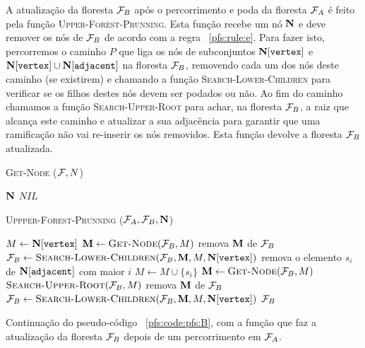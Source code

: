 \newpage
A atualização da floresta $\mathcal{F}_B$ após o percorrimento e poda da
floresta $\mathcal{F}_A$ é feito pela função \textsc{Upper-Forest-Prunning}.
Esta função recebe um nó $\mathbf N$ e deve remover os nós de 
$\mathcal{F}_B$ de acordo com a regra ~\ref{pfs:rule:e}. Para fazer isto, 
percorremos o caminho $P$ que liga os nós de subconjuntos 
$\mathbf N[\texttt{vertex}]$ e $\mathbf N[\texttt{vertex}] \cup 
\mathbf N[\texttt{adjacent}]$ na floresta $\mathcal{F}_B$, removendo cada
um dos nós deste caminho (se existirem) e chamando a função 
\textsc{Search-Lower-Children} para verificar se os filhos destes nós
devem ser podados ou não. Ao fim do caminho chamamos a função 
\textsc{Search-Upper-Root} para achar, na floresta $\mathcal{F}_B$, a raiz
que alcança este caminho e atualizar a sua adjacência  para garantir que 
uma ramificação não vai re-inserir os nós removidos. 
Esta função devolve a floresta $\mathcal{F}_B$ atualizada.

\begin{algorithm}[H]
    \textsc{Get-Node} ($\mathcal{F}, N$)
    \begin{algorithmic}[1]
            \Return $\mathbf N$
        \Else
            \Return $NIL$
        \EndIf
    \end{algorithmic}
    \vspace{1em}
    \textsc{Uppper-Forest-Prunning} ($\mathcal{F}_A, \mathcal{F}_B, \mathbf N$)
    \begin{algorithmic}[1]
        \State $M \gets \mathbf N[\texttt{vertex}]$
            \State $\mathbf M \gets {\normalfont\textsc{Get-Node}} (\mathcal{F}_B, M)$
                \State remova $\mathbf M$ de $\mathcal{F}_B$
            \EndIf
            \State $\mathcal{F}_B \gets {\normalfont\textsc{Search-Lower-Children}} (\mathcal{F}_B, \mathbf M, M, \mathbf N[\texttt{vertex}])$
            \State remova o elemento $s_i$ de $\mathbf N[\texttt{adjacent}]$ com maior $i$
            \State $M \gets M \cup \{s_i\}$
        \EndWhile
        \State $\mathbf M \gets {\normalfont\textsc{Get-Node}} (\mathcal{F}_B, M)$
            \State ${\normalfont\textsc{Search-Upper-Root}} (\mathcal{F}_B, M)$
        \Else
            \State remova $\mathbf M$ de $\mathcal{F}_B$
        \EndIf
        \State $\mathcal{F}_B \gets {\normalfont\textsc{Search-Lower-Children}} (\mathcal{F}_B, \mathbf M, M, \mathbf N[\texttt{vertex}])$
        \Return $\mathcal{F}_B$
    \end{algorithmic}
    \caption{Continuação do pseudo-código ~\ref{pfs:code:pfs:B}, com a
    função que faz a atualização da floresta $\mathcal{F}_B$ depois de um 
    percorrimento em $\mathcal{F}_A$.}
    \label{pfs:code:pfs:C}
\end{algorithm}



